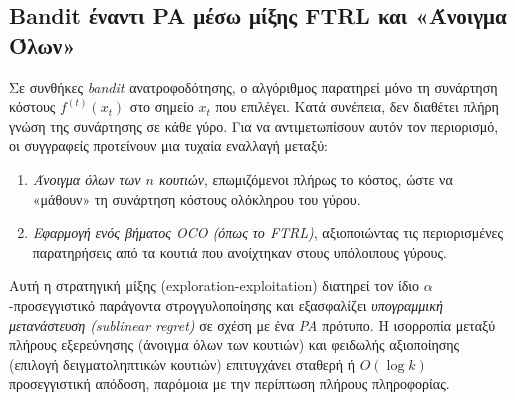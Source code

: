 \documentclass[11pt,a4paper]{article}
\begin{document}
\subsection*{Bandit έναντι PA μέσω μίξης FTRL και «Άνοιγμα Όλων»}
Σε συνθήκες \textit{bandit} ανατροφοδότησης, ο αλγόριθμος παρατηρεί μόνο τη συνάρτηση κόστους $f^{(t)}(x_t)$ στο σημείο $x_t$ που επιλέγει. Κατά συνέπεια, δεν διαθέτει πλήρη γνώση της συνάρτησης σε κάθε γύρο. Για να αντιμετωπίσουν αυτόν τον περιορισμό, οι συγγραφείς προτείνουν μια τυχαία εναλλαγή μεταξύ:
\begin{enumerate}
  \item \textit{Άνοιγμα όλων των $n$ κουτιών}, επωμιζόμενοι πλήρως το κόστος, ώστε να «μάθουν» τη συνάρτηση κόστους ολόκληρου του γύρου.
  \item \textit{Εφαρμογή ενός βήματος OCO (όπως το FTRL)}, αξιοποιώντας τις περιορισμένες παρατηρήσεις από τα κουτιά που ανοίχτηκαν στους υπόλοιπους γύρους.
\end{enumerate}
Αυτή η στρατηγική μίξης (exploration-exploitation) διατηρεί τον ίδιο \(\alpha\)-προσεγγιστικό παράγοντα στρογγυλοποίησης και εξασφαλίζει \textit{υπογραμμική μετανάστευση (sublinear regret)} σε σχέση με ένα \textit{PA} πρότυπο. Η ισορροπία μεταξύ πλήρους εξερεύνησης (άνοιγμα όλων των κουτιών) και φειδωλής αξιοποίησης (επιλογή δειγματοληπτικών κουτιών) επιτυγχάνει σταθερή ή $O(\log k)$ προσεγγιστική απόδοση, παρόμοια με την περίπτωση πλήρους πληροφορίας.
\end{document}
